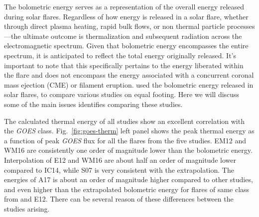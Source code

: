 \begin{table}[h!]
    \centering
    \hline 
    \hline
    \caption{The details of the studies.}
    \label{tab1}
\end{table}

The bolometric energy serves as a representation of the overall energy released during solar flares. Regardless of how energy is released in a solar flare, whether through direct plasma heating, rapid bulk flows, or non thermal particle processes—the ultimate outcome is thermalization and subsequent radiation across the electromagnetic spectrum. Given that bolometric energy encompasses the entire spectrum, it is anticipated to reflect the total energy originally released. It's important to note that this specifically pertains to the energy liberated within the flare and does not encompass the energy associated with a concurrent coronal mass ejection (CME) or filament eruption. \cite{warmuth20} used the bolometric energy released in solar flares, to compare various studies on equal footing. Here we will discuss some of the main issues \cite{warmuth20} identifies comparing these studies.

The calculated thermal energy of all studies show an excellent correlation with the {\it GOES} class. Fig.~\ref{fig:goes-therm} left panel shows the peak thermal energy as a function of peak {\it GOES} flux for all the flares from the five studies. EM12 and WM16 are consistently one order of magnitude lower than the bolometric energy. Interpolation of E12 and WM16 are about half an order of magnitude lower compared to IC14, while S07 is very consistent with the extrapolation. The energies of A17 is about an order of magnitude higher compared to other studies, and even higher than the extrapolated bolometric energy for flares of same class from \cite{kretzschmar11} and E12. There can be several reason of these differences between the studies arising.

